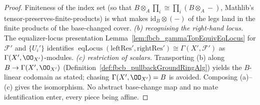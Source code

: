 \begin{lemma}
\begin{proof}
    Finiteness of the index set (so that \(B\otimes_A\prod_i \cong \prod_i (B\otimes_A -)\),
    Mathlib's tensor-preserves-finite-products) is what makes \(\mathrm{id}_B\otimes(-)\) of
    the legs land in the finite products of the base-changed cover.
    \emph{(b) recognising the right-hand locus.} The equalizer-locus presentation
    Lemma~\ref{lem:fbcb_gammaTopEquivEqLocus} for \(\mathcal{F}'\) and \(\{U_i'\}\) identifies
    \(\operatorname{eqLocus}(\mathrm{leftRes}',\mathrm{rightRes}') \cong \Gamma(X',\mathcal{F}')\)
    as \(\Gamma(X',\OO_{X'})\)-modules.
    \emph{(c) restriction of scalars.} Transporting (b) along \(B \to \Gamma(X',\OO_{X'})\)
    (Definition~\ref{def:fbcb_pullbackGroundRingAlg}) yields the \(B\)-linear codomain as
    stated; chasing \(\Gamma(X',\OO_{X'}) = B\) is avoided. Composing (a)–(c) gives the
    isomorphism. No abstract base-change map and no mate identification enter, every piece
    being affine.
  \end{proof}
\end{lemma}

